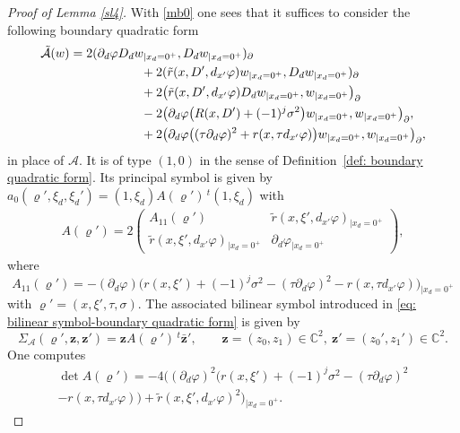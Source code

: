 \documentclass[JEP,XML,SOM,Unicode,published]{cedram}
\theoremstyle{plain}
\theoremstyle{definition}
\def\C{\mathbb{C}}
\let\y\varrho
\newcommand{\inp}[2]{(#1, #2)}
\newcommand{\biginp}[2]{\big(#1, #2 \big)}
\newcommand{\un}[1]{\Sigma_{#1}}
\newcommand{\z}{\boldsymbol{z}}
\newcommand{\br}{\ensuremath{_{|x_d=0^+}}}
\newcommand{\transp}{\ensuremath{\phantom{}^{t}}}
\begin{document}
\begin{proof}[ Proof of Lemma \ref{sl4}]
With \eqref{mb0} one sees that it suffices to consider the following boundary
quadratic form
\[
\begin{split}
\tilde{\mathcal{A}}(w)
&=2 \inp{\partial_d\varphi D_d w\br}{D_dw\br}_\partial \\
&\hspace*{2cm} + 2 \inp{\tilde{r} (x,D', d_{x'}\varphi) w\br}{D_dw\br}_\partial \\
& \hspace*{2cm} + 2 \biginp{ \tilde{r} (x,D', d_{x'} \varphi) D_d
w\br}{w\br}_\partial \\
&\hspace*{2cm} - 2 \biginp{ \partial_d\varphi
\big(R(x,D') +(-1)^j \sigma^2\big)
w\br}{w\br}_\partial,
\\
&\hspace*{2cm} + 2 \biginp{ \partial_d\varphi
\big((\tau\partial_d\varphi)^2+r(x,\tau d_{x'}\varphi)\big)
w\br}{w\br}_\partial,
\end{split}
\]
in place of $\mathcal A$. It is of type $(1,0)$ in the sense of Definition~\ref{def: boundary quadratic form}.
Its principal symbol is given by $a_0(\y',\xi_d, \xi_d') = (1, \xi_d) A(\y')\, \transp(1, \xi_d)$ with
\begin{align*}
A (\y') = 2 \begin{pmatrix}
A_{11} (\y')
& \tilde{r}(x,\xi',d_{x'}\varphi)\br
\\
\tilde{r}(x,\xi',d_{x'}\varphi) \br
& \partial_d\varphi\br
\end{pmatrix},
\end{align*}
where
\begin{equation*}
A_{11} (\y') =- (\partial_d\varphi)\big(r(x,\xi') + (-1)^j\sigma^2-(\tau\partial_d\varphi)^2-r(x,\tau
d_{x'}\varphi)\big)\br
\end{equation*}
with $\y' = (x,\xi',\tau,\sigma)$. The associated bilinear symbol
introduced in \eqref{eq: bilinear
symbol-boundary quadratic form}
is given by
\begin{equation*}
\un{\mathcal A}(\y',\z,\z') = \z A (\y') \, \transp \bar{\z}',\qquad \z=(z_0,
z_1) \in \C^2, \ \z' =(z_0',z_1') \in \C^2.
\end{equation*}
One computes
\begin{multline*}
\det A(\y') = - 4
\Big((\partial_d\varphi)^2 \big(r(x,\xi') +
(-1)^j\sigma^2-(\tau\partial_d\varphi)^2\\[-5pt]
-r(x,\tau d_{x'}\varphi)\big)+ \tilde{r}(x,\xi',d_{x'}\varphi) ^2\Big) \br.

\end{multline*}
\end{proof}
\end{document}
